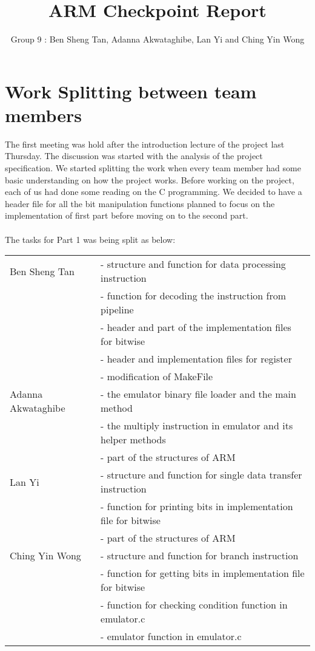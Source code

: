 \documentclass[11pt]{article}
\begin{document}
\title{ARM Checkpoint Report }
\author{Group 9 : Ben Sheng Tan, Adanna Akwataghibe, Lan Yi and Ching Yin Wong}

\maketitle

\section{Work Splitting between team members}


The first meeting was hold after the introduction lecture of the project last
Thursday. The discussion was started with the analysis of the project
specification. We started splitting the work when every team member had some
basic understanding on how the project works. Before working on the project,
each of us had done some reading on the C programming.  We decided to have a
header file for all the bit manipulation functions planned to focus
on the implementation of first part before moving on to the second part.\\
\\
The tasks for Part 1 was being split as below:\\

\medskip

\begin{tabular}{ |p{5cm}|p{10cm}| }
\hline
Ben Sheng Tan
&  - structure and function for data processing instruction \\
& - function for decoding the instruction from pipeline \\
& - header and part of the implementation files for bitwise \\
& - header and implementation files for register \\
& - modification of MakeFile \\
\hline
Adanna Akwataghibe
&  - the emulator binary file loader and the main method \\
& - the multiply instruction in emulator and its helper methods\\
& - part of the structures of ARM\\
\hline
Lan Yi
&  - structure and function for single data transfer instruction\\
& - function for printing bits in implementation file for bitwise\\
& - part of the structures of ARM\\
\hline
Ching Yin Wong
& - structure and function for branch instruction\\
& - function for getting bits in implementation file for bitwise\\
& - function for checking condition function in emulator.c\\
& - emulator function in emulator.c\\
\hline
\end{tabular}
\end{document}
